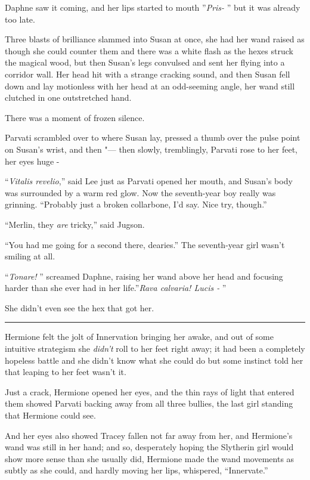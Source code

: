 Daphne saw it coming, and her lips started to mouth ''\emph{Pris-} '' but
it was already too late.

Three blasts of brilliance slammed into Susan at once, she had her wand
raised as though she could counter them and there was a white flash as
the hexes struck the magical wood, but then Susan's legs convulsed and
sent her flying into a corridor wall. Her head hit with a strange
cracking sound, and then Susan fell down and lay motionless with her
head at an odd-seeming angle, her wand still clutched in one
outstretched hand.

There was a moment of frozen silence.

Parvati scrambled over to where Susan lay, pressed a thumb over the
pulse point on Susan's wrist, and then "--- then slowly, tremblingly,
Parvati rose to her feet, her eyes huge -

``\emph{Vitalis revelio},'' said Lee just as Parvati opened her mouth,
and Susan's body was surrounded by a warm red glow. Now the seventh-year
boy really was grinning. ``Probably just a broken collarbone, I'd say.
Nice try, though.''

``Merlin, they \emph{are} tricky,'' said Jugson.

``You had me going for a second there, dearies.'' The seventh-year girl
wasn't smiling at all.

``\emph{Tonare!} '' screamed Daphne, raising her wand above her head and
focusing harder than she ever had in her life.''\emph{Rava calvaria!
Lucis -} ''

She didn't even see the hex that got her.

\begin{center}\rule{3in}{0.4pt}\end{center}

Hermione felt the jolt of Innervation bringing her awake, and out of
some intuitive strategism she \emph{didn't} roll to her feet right away;
it had been a completely hopeless battle and she didn't know what she
could do but some instinct told her that leaping to her feet wasn't it.

Just a crack, Hermione opened her eyes, and the thin rays of light that
entered them showed Parvati backing away from all three bullies, the
last girl standing that Hermione could see.

And her eyes also showed Tracey fallen not far away from her, and
Hermione's wand was still in her hand; and so, desperately hoping the
Slytherin girl would show more sense than she usually did, Hermione made
the wand movements as subtly as she could, and hardly moving her lips,
whispered, ``Innervate.''

